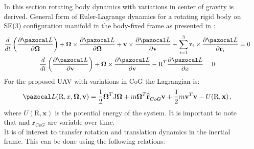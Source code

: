 In this section rotating body dynamics with variations in center of gravity is derived.
General form of Euler-Lagrange dynamics for a rotating rigid body on SE(3) configuration manifold in the body-fixed frame as presented in \cite{LeeModel}:
\begin{gather}
	\frac{d}{dt} \left( \frac{\partial \La}{\partial \mb{\Omega}} \right)
	+ \mb{\Omega} \times \frac{\partial \La}{\partial \mb{\Omega}} 
	+ \textbf{v} \times \frac{\partial \La}{\partial \textbf{v}} 
	+ \sum_{i=1}^{3} \textbf{r}_i \times \frac{\partial \La}{\partial \textbf{r}_i} = 0 \label{general1}\\
	\frac{d}{dt} \left( \frac{\partial \La}{\partial \textbf{v}} \right)
	+ \mb{\Omega} \times \frac{\partial \La}{\partial \textbf{v}} 
	- \text{R}^T \frac{\partial \La}{\partial x} = 0 \label{general2}
\end{gather}
For the proposed UAV with variations in CoG the Lagrangian is:
\begin{equation}
	\La(\text{R},x,\mb{\Omega},\textbf{v}) = \frac{1}{2}\mb{\Omega}^T\text{J}\mb{\Omega} + m \mb{\Omega}^T \reallywidehat{\textbf{r}}_{CoG}\textbf{v} + \frac{1}{2}m\textbf{v}^T\textbf{v} - U(\text{R},\textbf{x}) \, ,
\end{equation}
where $U(\text{R}, \textbf{x})$ is the potential energy of the system. It is important to note that  and $\textbf{r}_{CoG}$ are variable over time. \\
It is of interest to transfer rotation and translation dynamics in the inertial frame. This can be done using the following relations:
